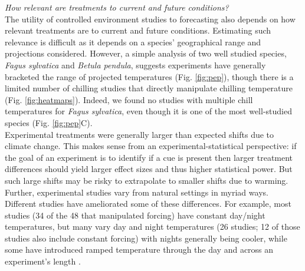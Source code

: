 \documentclass[11pt,letter]{article}
\begin{document}
\emph{How relevant are treatments to current and future conditions?}\\
The utility of controlled environment studies to forecasting also depends on how relevant treatments are to current and future conditions. Estimating such relevance is difficult as it depends on a species' geographical range and projections considered. However, a simple analysis of two well studied species, \emph{Fagus sylvatica} and \emph{Betula pendula}, suggests experiments have generally bracketed the range of projected temperatures (Fig. \ref{fig:pep}), though there is a limited number of chilling studies that directly manipulate chilling temperature (Fig. \ref{fig:heatmaps}). Indeed, we found no studies with multiple chill temperatures for \emph{Fagus sylvatica}, even though it is one of the most well-studied species (Fig. \ref{fig:pep}C). \\ %

Experimental treatments were generally larger than expected shifts due to climate change. This makes sense from an experimental-statistical perspective: if the goal of an experiment is to identify if a cue is present then larger treatment differences should yield larger effect sizes and thus higher statistical power. But such large shifts may be risky to extrapolate to smaller shifts due to warming. Further, experimental studies vary from natural settings in myriad ways. Different studies have ameliorated some of these differences. For example, most studies (34 of the 48 that manipulated forcing) have constant day/night temperatures, but many vary day and night temperatures (26 studies; 12 of those studies also include constant forcing) with nights generally being cooler, while some have introduced ramped temperature through the day and across an experiment's length \citep[e.g.,][]{Basler:2012,Laube:2014a}.  %
\end{document}
